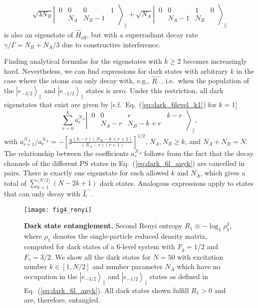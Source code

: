 \documentclass[aps,prx,superscriptaddress,twocolumn,notitlepage,nofootinbib,longbibliography]{revtex4-2}
\newcommand{\ket}[1]{\left|#1\right>}
\begin{document}
\begin{align}
	\sqrt{3N_B} \left|\, \begin{smallmatrix} 0 & 0 & 0 & 1 \\  & N_A & N_B-1 &  \end{smallmatrix} \,\right\rangle_\parallel + \sqrt{N_A} \left|\, \begin{smallmatrix} 0 & 0 & 1 & 0 \\  & N_A-1 & N_B &  \end{smallmatrix} \,\right\rangle_\parallel 
\label{eq:SRstate_6level_k1}
\end{align}
is also an eigenstate of $\hat{H}_\text{eff}$, but with a superradiant decay rate $\gamma/\Gamma=N_B+N_A/3$ due to constructive interference.

Finding analytical formulas for the eigenstates with $k\geq2$ becomes increasingly hard. Nevertheless, we can find expressions for dark states with arbitrary $k$ in the case where the atoms can only decay with, e.g., $\hat{R}^-$, i.e.~when the population of the $\ket{e_{-3/2}}_\parallel$ and $\ket{e_{-1/2}}_\parallel$ states is zero. Under this restriction, all dark eigenstates that exist are given by [c.f.~Eq.~(\ref{eq:dark_6level_k1}) for $k=1$]
\begin{equation}
    \sum_{r=0}^k a^{N_A}_r \left|\, \begin{matrix} 0 & 0 & r & k-r \\  & N_A-r & N_B-k+r &  \end{matrix} \,\right\rangle_\parallel ,
\label{eq:dark_6l_anyk}
\end{equation}
with $a^{N_A}_{r+1}/a^{N_A}_r = - [ 3 \frac{ (k-r)(N_B-k+r+1)}{(N_A-r)(r+1)} ]^{1/2}$, $N_A,N_B\geq k$, and $N_A+N_B=N$.
The relationship between the coefficients $a^{N_A}_r$ follows from the fact that the decay channels of the different PS states in Eq.~(\ref{eq:dark_6l_anyk}) are cancelled in pairs.
There is exactly one eigenstate for each allowed $k$ and $N_A$, which gives a total of $\sum_{k=1}^{\lfloor N/2 \rfloor} (N-2k+1)$ dark states.
Analogous expressions apply to states that can only decay with $\hat{L}^-$.

\begin{figure}[t]
\centering
\texttt{[image: fig4\_renyi]}
\caption{\textbf{Dark state entanglement.} Second Renyi entropy $R_1\equiv -\log_4\rho_1^2$, where $\rho_1$ denotes the single-particle reduced density matrix, computed for dark states of a 6-level system with $F_g=1/2$ and $F_e=3/2$. We show all the dark states for $N=50$ with excitation number $k\in[1,N/2]$ and number parameter $N_A$ which have no occupation in the $\ket{e_{-3/2}}_\parallel$ and $\ket{e_{-1/2}}_\parallel$ states as defined in Eq.~(\ref{eq:dark_6l_anyk}). All dark states shown fulfill $R_1>0$ and are, therefore, entangled.}
\label{fig:renyi}
\end{figure}
\end{document}
